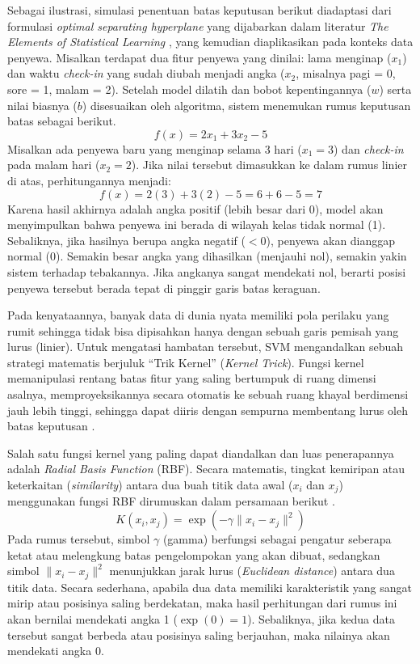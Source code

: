     Sebagai ilustrasi, simulasi penentuan batas keputusan berikut diadaptasi dari formulasi \textit{optimal separating hyperplane} yang dijabarkan dalam literatur \textit{The Elements of Statistical Learning} \cite{hastie2009elements}, yang kemudian diaplikasikan pada konteks data penyewa. Misalkan terdapat dua fitur penyewa yang dinilai: lama menginap ($x_1$) dan waktu \textit{check-in} yang sudah diubah menjadi angka ($x_2$, misalnya pagi = 0, sore = 1, malam = 2). Setelah model dilatih dan bobot kepentingannya ($w$) serta nilai biasnya ($b$) disesuaikan oleh algoritma, sistem menemukan rumus keputusan batas sebagai berikut.
    $$
    f(x) = 2x_1 + 3x_2 - 5
    $$
    Misalkan ada penyewa baru yang menginap selama 3 hari ($x_1 = 3$) dan \textit{check-in} pada malam hari ($x_2 = 2$). Jika nilai tersebut dimasukkan ke dalam rumus linier di atas, perhitungannya menjadi:
    $$
    f(x) = 2(3) + 3(2) - 5 = 6 + 6 - 5 = 7
    $$
    Karena hasil akhirnya adalah angka positif (lebih besar dari 0), model akan menyimpulkan bahwa penyewa ini berada di wilayah kelas tidak normal (1). Sebaliknya, jika hasilnya berupa angka negatif ($< 0$), penyewa akan dianggap normal (0). Semakin besar angka yang dihasilkan (menjauhi nol), semakin yakin sistem terhadap tebakannya. Jika angkanya sangat mendekati nol, berarti posisi penyewa tersebut berada tepat di pinggir garis batas keraguan.
    
    Pada kenyataannya, banyak data di dunia nyata memiliki pola perilaku yang rumit sehingga tidak bisa dipisahkan hanya dengan sebuah garis pemisah yang lurus (linier). Untuk mengatasi hambatan tersebut, SVM mengandalkan sebuah strategi matematis berjuluk ``Trik Kernel'' (\textit{Kernel Trick}). Fungsi kernel memanipulasi rentang batas fitur yang saling bertumpuk di ruang dimensi asalnya, memproyeksikannya secara otomatis ke sebuah ruang khayal berdimensi jauh lebih tinggi, sehingga dapat diiris dengan sempurna membentang lurus oleh batas keputusan \cite{scholkopf2002learning}.

    Salah satu fungsi kernel yang paling dapat diandalkan dan luas penerapannya adalah \textit{Radial Basis Function} (RBF). Secara matematis, tingkat kemiripan atau keterkaitan (\textit{similarity}) antara dua buah titik data awal ($x_i$ dan $x_j$) menggunakan fungsi RBF dirumuskan dalam persamaan berikut \cite{hastie2009elements}.
    $$
    K(x_i, x_j) = \exp(-\gamma \|x_i - x_j\|^2)
    $$
    Pada rumus tersebut, simbol $\gamma$ (gamma) berfungsi sebagai pengatur seberapa ketat atau melengkung batas pengelompokan yang akan dibuat, sedangkan simbol $\|x_i - x_j\|^2$ menunjukkan jarak lurus (\textit{Euclidean distance}) antara dua titik data.  Secara sederhana, apabila dua data memiliki karakteristik yang sangat mirip atau posisinya saling berdekatan, maka hasil perhitungan dari rumus ini akan bernilai mendekati angka 1 ($\exp(0) = 1$). Sebaliknya, jika kedua data tersebut sangat berbeda atau posisinya saling berjauhan, maka nilainya akan mendekati angka 0.

